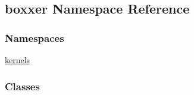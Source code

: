 \hypertarget{namespaceboxxer}{}\subsection{boxxer Namespace Reference}
\label{namespaceboxxer}
\subsubsection*{Namespaces}
\begin{DoxyCompactItemize}
\item 
 \hyperlink{namespaceboxxer_1_1kernels}{kernels}
\end{DoxyCompactItemize}
\subsubsection*{Classes}
